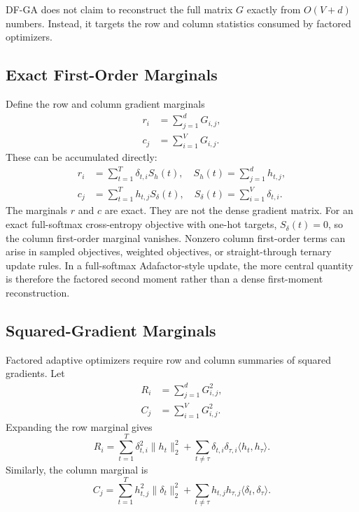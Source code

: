 \documentclass{article}
\begin{document}
DF-GA does not claim to reconstruct the full matrix $G$ exactly from
$O(V+d)$ numbers. Instead, it targets the row and column statistics consumed by
factored optimizers.

\subsection{Exact First-Order Marginals}

Define the row and column gradient marginals
\begin{align}
  r_i &= \sum_{j=1}^d G_{i,j}, \\
  c_j &= \sum_{i=1}^V G_{i,j}.
\end{align}
These can be accumulated directly:
\begin{align}
  r_i &= \sum_{t=1}^T \delta_{t,i} S_h(t),
  \quad S_h(t)=\sum_{j=1}^d h_{t,j}, \\
  c_j &= \sum_{t=1}^T h_{t,j} S_\delta(t),
  \quad S_\delta(t)=\sum_{i=1}^V \delta_{t,i}.
\end{align}
The marginals $r$ and $c$ are exact. They are not the dense gradient matrix.
For an exact full-softmax cross-entropy objective with one-hot targets,
$S_\delta(t)=0$, so the column first-order marginal vanishes. Nonzero column
first-order terms can arise in sampled objectives, weighted objectives, or
straight-through ternary update rules. In a full-softmax Adafactor-style update,
the more central quantity is therefore the factored second moment rather than a
dense first-moment reconstruction.

\subsection{Squared-Gradient Marginals}

Factored adaptive optimizers require row and column summaries of squared
gradients. Let
\begin{align}
  R_i &= \sum_{j=1}^d G_{i,j}^2, \\
  C_j &= \sum_{i=1}^V G_{i,j}^2.
\end{align}
Expanding the row marginal gives
\begin{equation}
  R_i =
  \sum_{t=1}^T \delta_{t,i}^2 \|h_t\|_2^2
  +
  \sum_{t \ne \tau} \delta_{t,i}\delta_{\tau,i}
  \langle h_t, h_\tau\rangle .
\end{equation}
Similarly, the column marginal is
\begin{equation}
  C_j =
  \sum_{t=1}^T h_{t,j}^2 \|\delta_t\|_2^2
  +
  \sum_{t \ne \tau} h_{t,j}h_{\tau,j}
  \langle \delta_t, \delta_\tau\rangle .
\end{equation}
\end{document}
